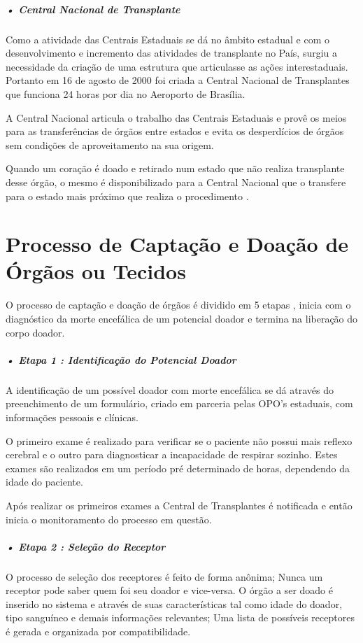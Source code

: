 \documentclass[portuguese,oneside]{tcc}
\begin{document}
\subparagraph{• Central Nacional de Transplante}
Como a atividade das Centrais Estaduais se dá no âmbito estadual e com o desenvolvimento e incremento das atividades de transplante no País, surgiu a necessidade da criação de uma estrutura que articulasse as ações interestaduais. Portanto em 16 de agosto de 2000 foi criada a Central Nacional de Transplantes que funciona 24 horas por dia no Aeroporto de Brasília. 

A Central Nacional articula o trabalho das Centrais Estaduais e provê os meios para as transferências de órgãos entre estados e evita os desperdícios de órgãos sem condições de aproveitamento na sua origem. 

Quando um coração é doado e retirado num estado que não realiza transplante desse órgão, o mesmo é disponibilizado para a Central Nacional que o transfere para o estado mais próximo que realiza o procedimento \cite{SCSCT}.

\section{Processo de Captação e Doação de Órgãos ou Tecidos} \label{tab:processo-captacao-doacao}
O processo de captação e doação de órgãos é dividido em 5 etapas \cite{EPRECISOEDUCAR}, inicia com o diagnóstico da morte encefálica de um potencial doador e termina na liberação do corpo doador.

\subparagraph{• Etapa 1 : Identificação do Potencial Doador}
A identificação de um possível doador com morte encefálica se dá através do preenchimento de um formulário, criado em parceria pelas OPO’s estaduais, com informações pessoais e clínicas.

O primeiro exame é realizado para verificar se o paciente não possui mais reflexo cerebral e o outro para diagnosticar a incapacidade de respirar sozinho. Estes exames são realizados em um período pré determinado de horas, dependendo da idade do paciente. 

Após realizar os primeiros exames a Central de Transplantes é notificada e então inicia o monitoramento do processo em questão.

\subparagraph{• Etapa 2 : Seleção do Receptor}
O processo de seleção dos receptores é feito de forma anônima; Nunca um receptor pode saber quem foi seu doador e vice-versa. O órgão a ser doado é inserido no sistema e através de suas características tal como idade do doador, tipo sanguíneo e demais informações relevantes; Uma lista de possíveis receptores é gerada e organizada por compatibilidade.
\end{document}
